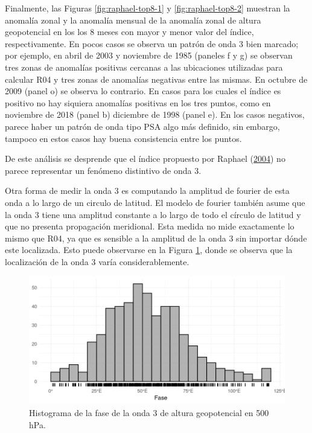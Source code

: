 \documentclass[12pt,oneside,a4paper]{reedthesis}
\begin{document}
Finalmente, las Figuras \ref{fig:raphael-top8-1} y \ref{fig:raphael-top8-2} muestran la anomalía zonal y la anomalía mensual de la anomalía zonal de altura geopotencial en los los 8 meses con mayor y menor valor del índice, respectivamente.
En pocos casos se observa un patrón de onda 3 bien marcado; por ejemplo, en abril de 2003 y noviembre de 1985 (paneles f y g) se observan tres zonas de anomalías positivas cercanas a las ubicaciones utilizadas para calcular R04 y tres zonas de anomalías negativas entre las mismas.
En octubre de 2009 (panel o) se observa lo contrario.
En casos para los cuales el índice es positivo no hay siquiera anomalías positivas en los tres puntos, como en noviembre de 2018 (panel b) diciembre de 1998 (panel e).
En los casos negativos, parece haber un patrón de onda tipo PSA algo más definido, sin embargo, tampoco en estos casos hay buena consistencia entre los puntos.

De este análisis se desprende que el índice propuesto por Raphael (\protect\hyperlink{ref-raphael2004}{2004}) no parece representar un fenómeno distintivo de onda 3.

Otra forma de medir la onda 3 es computando la amplitud de fourier de esta onda a lo largo de un circulo de latitud.
El modelo de fourier también asume que la onda 3 tiene una amplitud constante a lo largo de todo el círculo de latitud y que no presenta propagación meridional.
Esta medida no mide exactamente lo mismo que R04, ya que es sensible a la amplitud de la onda 3 sin importar dónde este localizada.
Esto puede observarse en la Figura \ref{fig:fase-histogram}, donde se observa que la localización de la onda 3 varía considerablemente.

\begin{figure}

{\centering \includegraphics{figures/15-onda3/fase-histogram-1} 

}

\caption{Histograma de la fase de la onda 3 de altura geopotencial en 500 hPa.}\label{fig:fase-histogram}
\end{figure}
\end{document}
